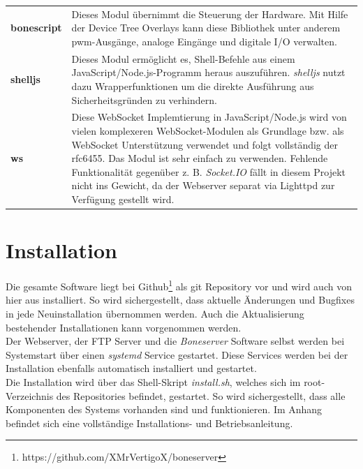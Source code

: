 \begin{longtabu} to \textwidth {
X[1]
X[5]}
\textbf{bonescript} & Dieses Modul übernimmt die Steuerung der Hardware. Mit Hilfe der Device Tree Overlays kann diese Bibliothek unter anderem \gls{pwm}-Ausgänge, analoge Eingänge und digitale I/O verwalten.\\
\textbf{shelljs} & Dieses Modul ermöglicht es, Shell-Befehle aus einem JavaScript/Node.js-Programm heraus auszuführen. \textit{shelljs} nutzt dazu Wrapperfunktionen um die direkte Ausführung aus Sicherheitsgründen zu verhindern.\\
\textbf{ws} & Diese WebSocket Implemtierung in JavaScript/Node.js wird von vielen komplexeren WebSocket-Modulen als Grundlage bzw. als WebSocket Unterstützung verwendet und folgt vollständig der rfc6455. Das Modul ist sehr einfach zu verwenden. Fehlende Funktionalität gegenüber z. B. \emph{Socket.IO} fällt in diesem Projekt nicht ins Gewicht, da der Webserver separat via Lighttpd zur Verfügung gestellt wird.
\end{longtabu}


\section{Installation}
Die gesamte Software liegt bei Github\footnote{https://github.com/XMrVertigoX/boneserver} als git Repository vor und wird auch von hier aus installiert. So wird sichergestellt, dass aktuelle Änderungen und Bugfixes in jede Neuinstallation übernommen werden. Auch die Aktualisierung bestehender Installationen kann vorgenommen werden.\\ 
Der Webserver, der FTP Server und die \textit{Boneserver} Software selbst werden bei Systemstart über einen \textit{systemd} Service gestartet. Diese Services werden bei der Installation ebenfalls automatisch installiert und gestartet.\\

Die Installation wird über das Shell-Skript \textit{install.sh}, welches sich im root-Verzeichnis des Repositories befindet, gestartet. So wird sichergestellt, dass alle Komponenten des Systems vorhanden sind und funktionieren. Im Anhang befindet sich eine vollständige Installations- und Betriebsanleitung.